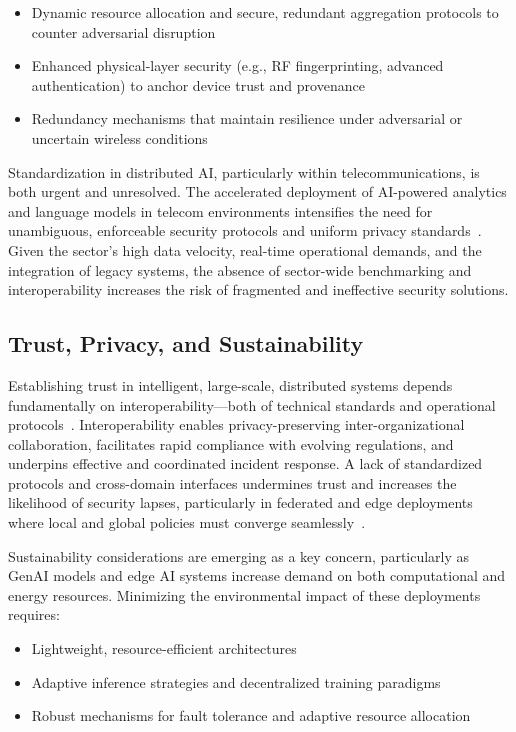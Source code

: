 \documentclass[sigconf]{acmart}
\begin{document}
\begin{itemize}
    \item Dynamic resource allocation and secure, redundant aggregation protocols to counter adversarial disruption~\cite{ref49}
    \item Enhanced physical-layer security (e.g., RF fingerprinting, advanced authentication) to anchor device trust and provenance~\cite{ref48}
    \item Redundancy mechanisms that maintain resilience under adversarial or uncertain wireless conditions
\end{itemize}

Standardization in distributed AI, particularly within telecommunications, is both urgent and unresolved. The accelerated deployment of AI-powered analytics and language models in telecom environments intensifies the need for unambiguous, enforceable security protocols and uniform privacy standards~\cite{ref42,ref44,ref49}. Given the sector's high data velocity, real-time operational demands, and the integration of legacy systems, the absence of sector-wide benchmarking and interoperability increases the risk of fragmented and ineffective security solutions.

\subsection{Trust, Privacy, and Sustainability}

Establishing trust in intelligent, large-scale, distributed systems depends fundamentally on interoperability—both of technical standards and operational protocols~\cite{ref7,ref17,ref18,ref19,ref20,ref21,ref23,ref24,ref26}. Interoperability enables privacy-preserving inter-organizational collaboration, facilitates rapid compliance with evolving regulations, and underpins effective and coordinated incident response. A lack of standardized protocols and cross-domain interfaces undermines trust and increases the likelihood of security lapses, particularly in federated and edge deployments where local and global policies must converge seamlessly~\cite{ref26}.

Sustainability considerations are emerging as a key concern, particularly as GenAI models and edge AI systems increase demand on both computational and energy resources. Minimizing the environmental impact of these deployments requires:

\begin{itemize}
    \item Lightweight, resource-efficient architectures
    \item Adaptive inference strategies and decentralized training paradigms
    \item Robust mechanisms for fault tolerance and adaptive resource allocation
\end{itemize}
\end{document}
